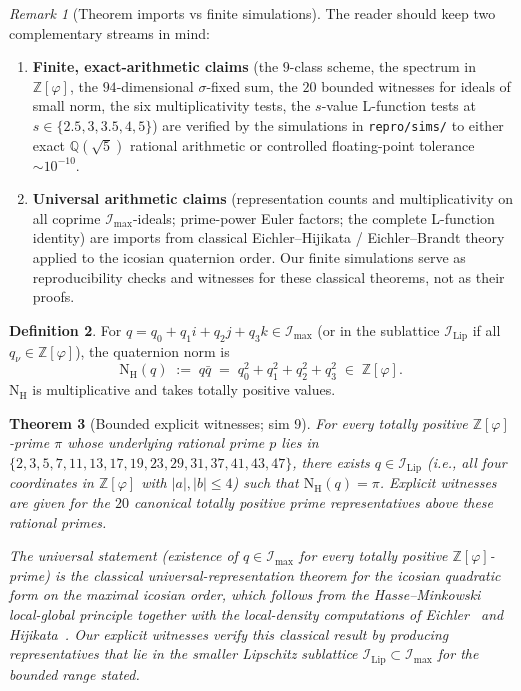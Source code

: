 \documentclass[11pt,a4paper]{article}
\newtheorem{theorem}{Theorem}
\theoremstyle{definition}
\newtheorem{definition}[theorem]{Definition}
\theoremstyle{remark}
\newtheorem{remark}[theorem]{Remark}
\newcommand{\Z}{\mathbb{Z}}
\newcommand{\Q}{\mathbb{Q}}
\newcommand{\IIlip}{\mathcal{I}_{\mathrm{Lip}}}
\newcommand{\IImax}{\mathcal{I}_{\mathrm{max}}}
\newcommand{\NH}{\mathrm{N}_{\mathrm{H}}}
\newcommand{\Zphi}{\Z[\varphi]}
\begin{document}
\begin{remark}[Theorem imports vs finite simulations]
The reader should keep two complementary streams in mind:
\begin{enumerate}
\item \textbf{Finite, exact-arithmetic claims} (the $9$-class scheme,
  the spectrum in $\Zphi$, the $94$-dimensional $\sigma$-fixed sum,
  the $20$ bounded witnesses for ideals of small norm, the six
  multiplicativity tests, the $s$-value L-function tests at
  $s \in \{2.5, 3, 3.5, 4, 5\}$) are verified by the simulations in
  \texttt{repro/sims/} to either exact $\Q(\sqrt 5)$ rational arithmetic
  or controlled floating-point tolerance $\sim 10^{-10}$.
\item \textbf{Universal arithmetic claims} (representation counts and
  multiplicativity on all coprime $\IImax$-ideals; prime-power Euler
  factors; the complete L-function identity) are imports from classical
  Eichler--Hijikata / Eichler--Brandt theory applied to the icosian
  quaternion order. Our finite simulations serve as reproducibility
  checks and witnesses for these classical theorems, not as their
  proofs.
\end{enumerate}
\end{remark}

\begin{definition}\label{def:NH}
For $q = q_0 + q_1 i + q_2 j + q_3 k \in \IImax$ (or in the sublattice
$\IIlip$ if all $q_\nu \in \Zphi$), the quaternion norm is
\[
  \NH(q) \;:=\; q\bar q \;=\; q_0^2 + q_1^2 + q_2^2 + q_3^2 \;\in\; \Zphi.
\]
$\NH$ is multiplicative and takes totally positive values.
\end{definition}

\begin{theorem}[Bounded explicit witnesses; sim 9]\label{thm:univ-rep}
For every totally positive $\Zphi$-prime $\pi$ whose underlying rational
prime $p$ lies in $\{2,3,5,7,11,13,17,19,23,29,31,37,41,43,47\}$, there
exists $q \in \IIlip$ (i.e., all four coordinates in $\Zphi$ with
$|a|, |b| \leq 4$) such that $\NH(q) = \pi$. Explicit witnesses are
given for the $20$ canonical totally positive prime representatives
above these rational primes.

The universal statement (existence of $q \in \IImax$ for every
totally positive $\Zphi$-prime) is the classical universal-representation
theorem for the icosian quadratic form on the maximal icosian order,
which follows from the Hasse--Minkowski local-global principle together
with the local-density computations of Eichler~\cite{eichler1958} and
Hijikata~\cite{hijikata1974}. Our explicit witnesses verify this
classical result by producing representatives that lie in the smaller
Lipschitz sublattice $\IIlip \subset \IImax$ for the bounded range
stated.
\end{theorem}
\end{document}
